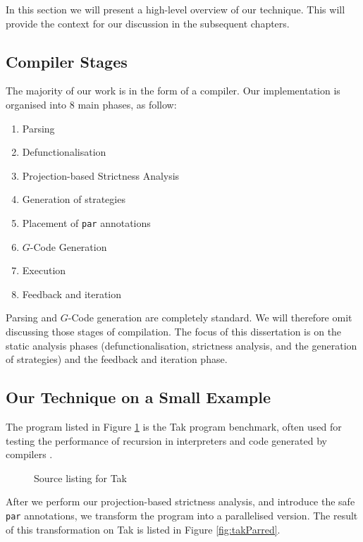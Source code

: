 In this section we will present a high-level overview of our technique.
This will provide the context for our discussion in the subsequent chapters.

\subsection{Compiler Stages}

The majority of our work is in the form of a compiler. Our implementation is
organised into 8 main phases, as follow:

\begin{enumerate}
    \item Parsing
    \item Defunctionalisation
    \item Projection-based Strictness Analysis
    \item Generation of strategies
    \item Placement of \verb-par- annotations
    \item $G$-Code Generation
    \item Execution
    \item Feedback and iteration
\end{enumerate}

Parsing and $G$-Code generation are completely standard. We will therefore
omit discussing those stages of compilation. The focus of this dissertation
is on the static analysis phases (defunctionalisation, strictness analysis,
and the generation of strategies) and the feedback and iteration phase.

\subsection{Our Technique on a Small Example}

The program listed in Figure \ref{fig:tak} is the Tak program benchmark, often used
for testing the performance of recursion in interpreters and code generated by
compilers \citep{ExamplesOfRecursion}.

\begin{figure}
  
\caption{Source listing for Tak}
\label{fig:tak}
\end{figure}

After we perform our projection-based strictness analysis, and introduce the
safe \verb-par- annotations, we transform the program into a parallelised
version. The result of this transformation on Tak is listed in Figure
\ref{fig:takParred}.

